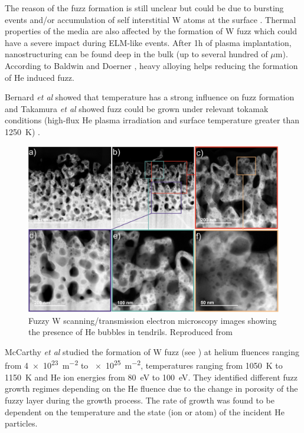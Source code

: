 The reason of the fuzz formation is still unclear but could be due to bursting events and/or accumulation of self interstitial W atoms at the surface .
Thermal properties of the media are also affected by the formation of W fuzz  which could have a severe impact during ELM-like events.
After 1h of plasma implantation, nanostructuring can be found deep in the bulk (up to several hundred of $\mu$m).
According to Baldwin and Doerner , heavy alloying helps reducing the formation of He induced fuzz.

Bernard \textit{et al} showed that temperature has a strong influence on fuzz formation  and Takamura \textit{et al} showed fuzz could be grown under relevant tokamak conditions (high-flux He plasma irradiation and surface temperature greater than \SI{1250}{K}) .

\begin{figure} [h!]
    \centering
    \includegraphics[width=\linewidth]{Figures/Chapter1/fuzz_mccarthy.jpg}
    \caption{Fuzzy W scanning/transmission electron microscopy images showing the presence of He bubbles in tendrils. Reproduced from \cite{mccarthy_enhanced_2020}}
\end{figure}

McCarthy \textit{et al} studied the formation of W fuzz (see ) at helium fluences ranging from \SI{4e23}{m^{-2}} to \SI{e25}{m^{-2}}, temperatures ranging from \SI{1050}{K} to \SI{1150}{K} and He ion energies from \SI{80}{eV} to \SI{100}{eV}.
They identified different fuzz growth regimes depending on the He fluence due to the change in porosity of the fuzzy layer during the growth process.
The rate of growth was found to be dependent on the temperature and the state (ion or atom) of the incident He particles.

